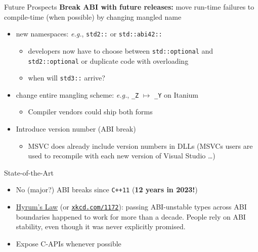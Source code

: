 \begin{frame}{Future Prospects}
    \textbf{Break ABI with future releases:} move run-time failures to compile-time (when possible) by changing mangled name

    \begin{itemize}
        \item new namespaces: \textit{e.g.}, \texttt{std2::} or \texttt{std::abi42::}
        \begin{itemize}
            \item developers now have to choose between \texttt{std::optional} and \texttt{std2::optional} or duplicate code with overloading
            \item when will \texttt{std3::} arrive?
        \end{itemize}
        \item change entire mangling scheme: \textit{e.g.}, \texttt{\_Z} $\mapsto$ \texttt{\_Y} on Itanium
        \begin{itemize}
            \item Compiler vendors could ship both forms
        \end{itemize}
        \item Introduce version number (ABI break)
        \begin{itemize}
            \item MSVC does already include version numbers in DLLs (MSVCs users are used to recompile with each new version of Visual Studio \ldots)
        \end{itemize}
    \end{itemize}
\end{frame}

\begin{frame}{State-of-the-Art}
    \begin{itemize}
        \item No (major?) ABI breaks since \texttt{C++11} (\textbf{12 years in 2023!})
        \item \href{https://www.hyrumslaw.com/}{Hyrum's Law} (or \href{https://xkcd.com/1172/}{\texttt{xkcd.com/1172}}): passing ABI-unstable types across ABI boundaries happened to work for more than a decade. People rely on ABI stability, even though it was never explicitly promised.
        \item Expose C-APIs whenever possible
    \end{itemize}
\end{frame}

